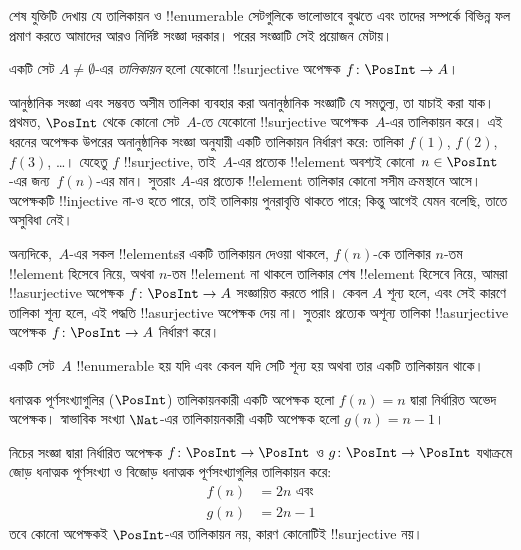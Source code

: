 \documentclass[../../../include/open-logic-section]{subfiles}
\begin{document}
শেষ যুক্তিটি দেখায় যে তালিকায়ন ও !!{enumerable} সেটগুলিকে ভালোভাবে বুঝতে এবং তাদের সম্পর্কে বিভিন্ন ফল প্রমাণ করতে আমাদের আরও নির্দিষ্ট সংজ্ঞা দরকার। পরের সংজ্ঞাটি সেই প্রয়োজন মেটায়।

\begin{defn}[তালিকায়ন, আনুষ্ঠানিকভাবে]
একটি সেট $A \neq \emptyset$-এর \emph{তালিকায়ন} হলো যেকোনো !!{surjective} অপেক্ষক $f \colon \PosInt \to A$।
\end{defn}

\begin{explain}
আনুষ্ঠানিক সংজ্ঞা এবং সম্ভবত অসীম তালিকা ব্যবহার করা অনানুষ্ঠানিক সংজ্ঞাটি যে সমতুল্য, তা যাচাই করা যাক। প্রথমত, $\PosInt$ থেকে কোনো সেট~$A$-তে যেকোনো !!{surjective} অপেক্ষক~$A$-এর তালিকায়ন করে। এই ধরনের অপেক্ষক উপরের অনানুষ্ঠানিক সংজ্ঞা অনুযায়ী একটি তালিকায়ন নির্ধারণ করে: তালিকা $f(1)$, $f(2)$, $f(3)$, \dots। যেহেতু $f$ !!{surjective}, তাই~$A$-এর প্রত্যেক !!{element} অবশ্যই কোনো~$n \in \PosInt$-এর জন্য~$f(n)$-এর মান। সুতরাং $A$-এর প্রত্যেক !!{element} তালিকার কোনো সসীম ক্রমস্থানে আসে। অপেক্ষকটি !!{injective} না-ও হতে পারে, তাই তালিকায় পুনরাবৃত্তি থাকতে পারে; কিন্তু আগেই যেমন বলেছি, তাতে অসুবিধা নেই।

অন্যদিকে,~$A$-এর সকল !!{element}sর একটি তালিকায়ন দেওয়া থাকলে, $f(n)$-কে তালিকার $n$-তম !!{element} হিসেবে নিয়ে, অথবা $n$-তম !!{element} না থাকলে তালিকার শেষ !!{element} হিসেবে নিয়ে, আমরা !!a{surjective} অপেক্ষক $f\colon \PosInt \to A$ সংজ্ঞায়িত করতে পারি। কেবল $A$ শূন্য হলে, এবং সেই কারণে তালিকা শূন্য হলে, এই পদ্ধতি !!a{surjective} অপেক্ষক দেয় না। সুতরাং প্রত্যেক অশূন্য তালিকা !!a{surjective} অপেক্ষক $f\colon \PosInt \to A$ নির্ধারণ করে।
\end{explain}

\begin{defn}
  একটি সেট~$A$ !!{enumerable} হয় যদি এবং কেবল যদি সেটি শূন্য হয় অথবা তার একটি তালিকায়ন থাকে।
\end{defn}

\begin{ex}
ধনাত্মক পূর্ণসংখ্যাগুলির ($\PosInt$) তালিকায়নকারী একটি অপেক্ষক হলো $f(n) = n$ দ্বারা নির্ধারিত অভেদ অপেক্ষক। স্বাভাবিক সংখ্যা $\Nat$-এর তালিকায়নকারী একটি অপেক্ষক হলো $g(n) = n - 1$।
\end{ex}

\begin{ex}
নিচের সংজ্ঞা দ্বারা নির্ধারিত অপেক্ষক $f\colon \PosInt \to \PosInt$ ও $g \colon \PosInt \to
\PosInt$ যথাক্রমে জোড় ধনাত্মক পূর্ণসংখ্যা ও বিজোড় ধনাত্মক পূর্ণসংখ্যাগুলির তালিকায়ন করে:
\begin{align*}
f(n) & = 2n \text{ এবং}\\
g(n) & = 2n - 1
\end{align*}
তবে কোনো অপেক্ষকই $\PosInt$-এর তালিকায়ন নয়, কারণ কোনোটিই !!{surjective} নয়।
\end{ex}
\end{document}
